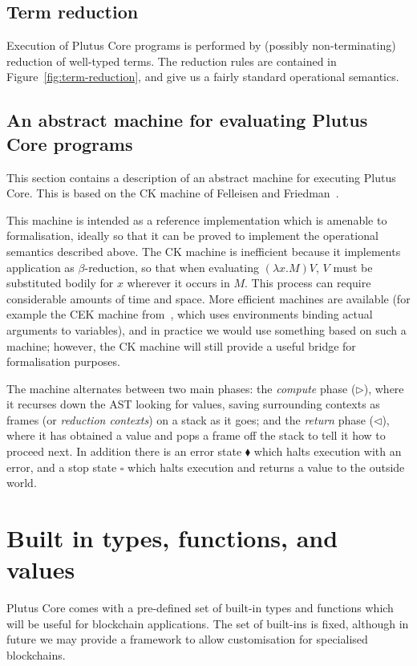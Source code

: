 \documentclass[a4paper]{article}
\begin{document}



\subsection{Term reduction}
Execution of Plutus Core programs is performed by (possibly
non-terminating) reduction of well-typed terms.  The reduction rules
are contained in Figure~\ref{fig:term-reduction}, and give us a fairly
standard operational semantics.



\subsection{An abstract machine for evaluating Plutus Core programs}
This section contains a description of an abstract machine for
executing Plutus Core.  This is based on the CK machine of Felleisen
and Friedman~\cite{Felleisen-CK-CEK}. 

This machine is intended as a reference implementation which is
amenable to formalisation, ideally so that it can be proved to
implement the operational semantics described above.  The CK machine
is inefficient because it implements application as $\beta$-reduction,
so that when evaluating $(\lambda x.M)V$, $V$ must be substituted
bodily for $x$ wherever it occurs in $M$.  This process can require
considerable amounts of time and space.  More efficient machines are
available (for example the CEK machine from~\cite{Felleisen-CK-CEK},
which uses environments binding actual arguments to variables), and in
practice we would use something based on such a machine; however, the
CK machine will still provide a useful bridge for formalisation
purposes.



\noindent The machine alternates between two main phases: the
\textit{compute} phase ($\triangleright$), where it recurses down
the AST looking for values, saving surrounding contexts as frames (or
\textit{reduction contexts}) on a stack as it goes; and the 
\textit{return} phase ($\triangleleft$), where it has obtained a value and
pops a frame off the stack to tell it how to proceed next.  In
addition there is an error state $\blacklozenge$ which halts execution
with an error, and a stop state $\square$ which halts execution and
returns a value to the outside world.

\section{Built in types, functions, and values}
\label{sec:builtins}
Plutus Core comes with a pre-defined set of built-in types and
functions which will be useful for blockchain applications.  The set
of built-ins is fixed, although in future we may provide a framework
to allow customisation for specialised blockchains.
\end{document}
